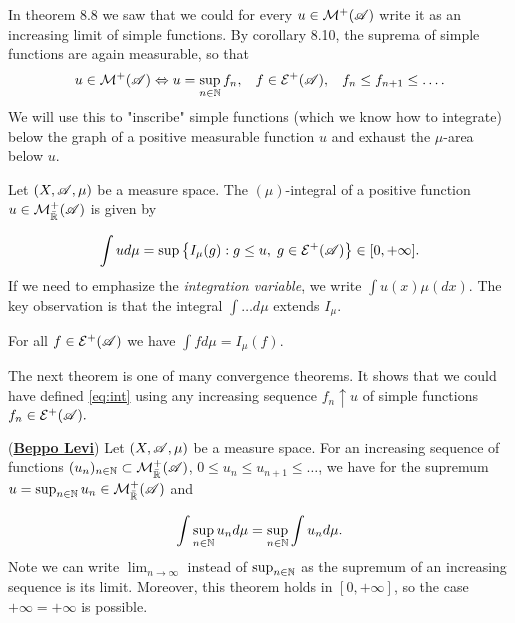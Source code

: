 In theorem 8.8 we saw that we could for every $u\in\mathcal{M}^+(\mathscr{A})$ write it as an increasing limit
of simple functions. By corollary 8.10, the suprema of simple functions are again measurable, so that 
\begin{align*}
    u\in\mathcal{M}^+(\mathscr{A})\Leftrightarrow u=\sup_{n\in\mathbb{N}} f_n,\hspace{3mm} f\in\mathcal{E}^+(\mathscr{A}),\hspace{3mm} f_n\leq f_{n+1}\leq\ldots.
\end{align*}
We will use this to "inscribe" simple functions (which we know how to integrate) below the graph of a 
positive measurable function $u$ and exhaust the $\mu$-area below $u$.
\begin{definition}
    Let $(X,\mathscr{A},\mu)$ be a measure space. The $(\mu)$-integral of a positive function $u\in\mathcal{M}_{\bar{\mathbb{R}}}^+(\mathscr{A})$ is given by 

    \begin{equation}
        \label{eq:int}
        \int ud\mu=\sup\left\{ I_\mu(g):g\leq u,\hspace{1mm} g\in\mathcal{E}^+(\mathscr{A}) \right\}\in[0,+\infty].
    \end{equation}
    If we need to emphasize the \textit{integration variable}, we write $\int u(x)\mu(dx).$
    The key observation is that the integral $\int\ldots d\mu$ extends $I_\mu.$

\end{definition}
\begin{lemma}
    For all $f\in\mathcal{E}^+(\mathscr{A})$ we have $\int fd\mu = I_\mu(f).$
\end{lemma}

The next theorem is one of many convergence theorems. It shows that we could have defined \ref*{eq:int} using any increasing
sequence $f_n\uparrow u$ of simple functions $f_n\in\mathcal{E}^+(\mathscr{A}).$

\begin{theorem}(\underline{\textbf{Beppo Levi}})
    Let $(X,\mathscr{A},\mu)$ be a measure space. For an increasing sequence of functions 
    $(u_n)_{n\in\mathbb{N}}\subset \mathcal{M}_{\bar{\mathbb{R}}}^+(\mathscr{A})$, $0\leq u_n\leq u_{n+1}\leq\ldots$, we have for the supremum $u=\sup_{n\in\mathbb{N}} u_n\in\mathcal{M}_{\bar{\mathbb{R}}}^+(\mathscr{A})$
    and 

    \begin{align}
        \int \sup_{n\in\mathbb{N}} u_nd\mu =\sup_{n\in\mathbb{N}} \int  u_nd\mu.
    \end{align}
Note we can write $\lim_{n\rightarrow \infty}$ instead of $\sup_{n\in\mathbb{N}}$ as the supremum of an increasing sequence
is its limit. Moreover, this theorem holds in $[0,+\infty]$, so the case $+\infty = +\infty$ is possible. 
\end{theorem}

